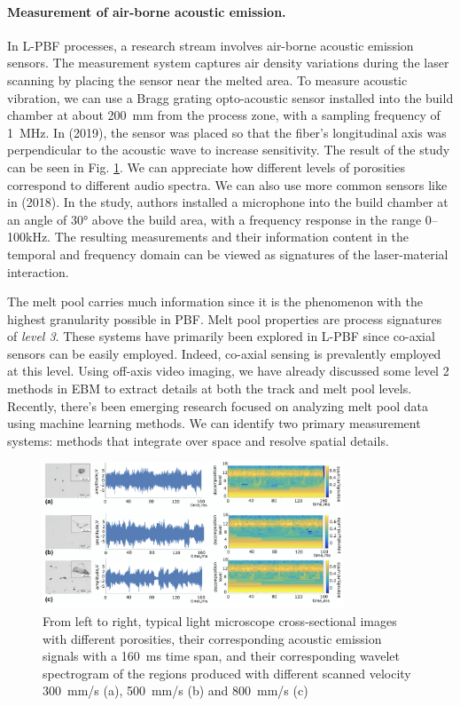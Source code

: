 \paragraph{Measurement of air-borne acoustic emission.} In L-PBF processes, a research stream involves air-borne acoustic emission sensors. The measurement system captures air density variations during the laser scanning by placing the sensor near the melted area. To measure acoustic vibration, we can use a Bragg grating opto-acoustic sensor installed into the build chamber at about \SI{200}{\milli\metre} from the process zone, with a sampling frequency of \SI{1}{\mega\hertz}. In \citeauthor{wasmer_situ_2019} (2019), the sensor was placed so that the fiber's longitudinal axis was perpendicular to the acoustic wave to increase sensitivity. The result of the study can be seen in Fig. \ref{fig:acustic}. We can appreciate how different levels of porosities correspond to different audio spectra. We can also use more common sensors like in \citeauthor{ye_defect_2018} (2018). In the study, authors installed a microphone into the build chamber at an angle of \ang{30} above the build area, with a frequency response in the range \numrange[range-phrase=--]{0}{100}\unit{\kilo\hertz}. The resulting measurements and their information content in the temporal and frequency domain can be viewed as signatures of the laser-material interaction.

The melt pool carries much information since it is the phenomenon with the highest granularity possible in PBF. Melt pool properties are process signatures of \emph{level 3}. These systems have primarily been explored in L-PBF since co-axial sensors can be easily employed. Indeed, co-axial sensing is prevalently employed at this level. Using off-axis video imaging, we have already discussed some level 2 methods in EBM to extract details at both the track and melt pool levels. Recently, there's been emerging research focused on analyzing melt pool data using machine learning methods. We can identify two primary measurement systems: methods that integrate over space and resolve spatial details.
\begin{figure}
    \centering
    \includegraphics[width = 0.8\textwidth]{Images/acustic.png}
    \caption[Example of AE of different porosities specimens.] {From left to right, typical light microscope cross-sectional images with different porosities, their corresponding acoustic emission signals with a \SI{160}{\milli\second} time span, and their corresponding wavelet spectrogram of the regions produced with different scanned velocity \SI{300}{\milli\metre / \second} (a), \SI{500}{\milli\metre / \second} (b) and \SI{800}{\milli\metre /\second} (c) \cite{wasmer_situ_2019}}
    \label{fig:acustic}
\end{figure}
